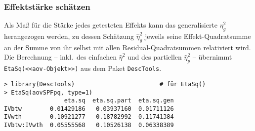 \subsubsection{Effektstärke schätzen}

Als Maß für die Stärke jedes getesteten Effekts kann das generalisierte $\eta_{g}^{2}$ herangezogen werden, zu dessen Schätzung $\hat{\eta}_{g}^{2}$ jeweils seine Effekt-Quadratsumme an der Summe von ihr selbst mit allen Residual-Quadratsummen relativiert wird. Die Berechnung -- inkl.\ des einfachen $\hat{\eta}^{2}$ und des partiellen $\hat{\eta}_{p}^{2}$ -- übernimmt \lstinline!EtaSq(<<aov-Objekt>>)! aus dem Paket \lstinline!DescTools!.
\begin{lstlisting}
> library(DescTools)                        # für EtaSq()
> EtaSq(aovSPFpq, type=1)
                 eta.sq  eta.sq.part  eta.sq.gen
IVbtw        0.01429186   0.03937160  0.01711126
IVwth        0.10921277   0.18782992  0.11741384
IVbtw:IVwth  0.05555568   0.10526138  0.06338389
\end{lstlisting}

